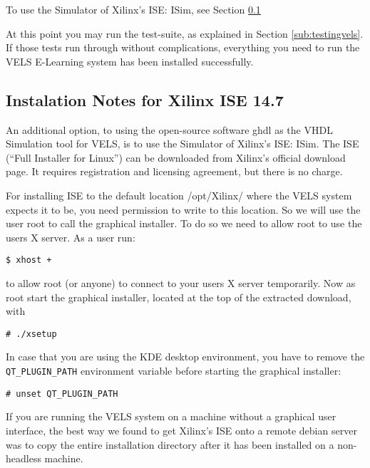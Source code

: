 To use the Simulator of Xilinx's ISE: ISim, see Section \ref{ISE-install}

At this point you may run the test-suite, as explained in Section \ref{sub:testingvels}.
If those tests run through without complications, everything you need to run the VELS
E-Learning system has been installed successfully.

\subsection{Instalation Notes for Xilinx ISE 14.7}\label{ISE-install}

An additional option, to using the open-source software ghdl as the VHDL Simulation tool for VELS, is to use the Simulator of Xilinx's ISE: ISim. The ISE (``Full Installer for Linux'') can be downloaded from Xilinx's official download page. It requires registration and licensing agreement, but there is no charge. 

For installing ISE to the default location /opt/Xilinx/ where the VELS system expects it to be, you need permission to write to this location. So we will use the user root to call the graphical installer. To do so we need to allow root to use the users X server. As a user run:

\begin{verbatim}
$ xhost +
\end{verbatim}

to allow root (or anyone) to connect to your users X server temporarily. Now as root start the graphical installer, located at the top of the extracted download, with

\begin{verbatim}
# ./xsetup
\end{verbatim}

In case that you are using the KDE desktop environment, you have to remove the \verb!QT_PLUGIN_PATH! environment variable before starting the graphical installer:

\begin{verbatim}
# unset QT_PLUGIN_PATH
\end{verbatim}

If you are running the VELS system on a machine without a graphical user interface, the best way we found to get Xilinx's ISE onto a remote debian server was to copy the entire installation directory after it has been installed on a non-headless machine.
